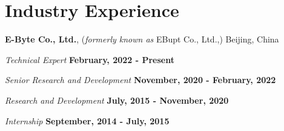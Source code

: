 \documentclass[letterpaper,11pt]{article}
\newcommand{\contentlength}{5.5in}
\begin{document}
	
	\section{\textbf{Industry Experience}}
	\begin{tcolorbox}[flush right,breakable,colback=white,colframe=white,width=\contentlength]
		\textbf{E-Byte Co., Ltd.}, (\textit{formerly known as} EBupt Co., Ltd.,) Beijing, China
		
		\quad \textit{Technical Expert} \null\hfill \textbf{February, 2022 - Present}
		
		\quad \textit{Senior Research and Development} \null\hfill \textbf{November, 2020 - February, 2022}
		
		\quad \textit{Research and Development} \null\hfill \textbf{July, 2015 - November, 2020}
		
		\quad \textit{Internship} \null\hfill \textbf{September, 2014 - July, 2015}
		
	\end{tcolorbox}
	
	
\end{document}
